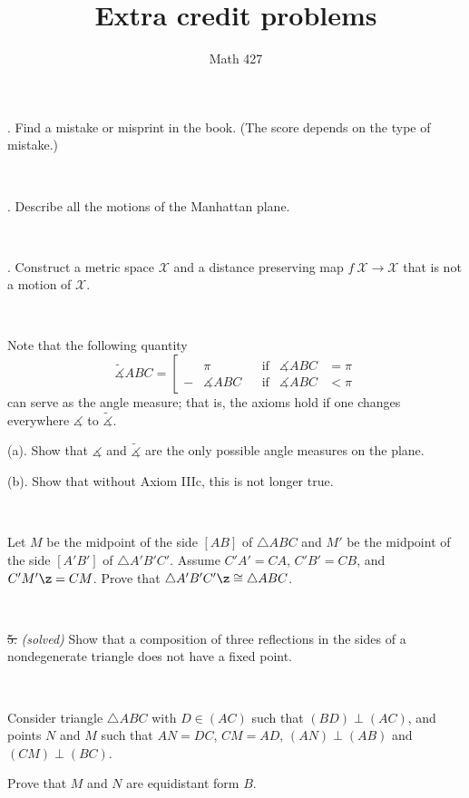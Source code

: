 \documentclass[oneside,a4paper]{article}
\begin{document}
\title{Extra credit problems}
\author{Math 427}
\date{}
\maketitle


. Find a mistake or misprint in the book.
(The score depends on the type of mistake.)

\ 

. Describe all the motions of the Manhattan plane.

\ 

. Construct a metric space $\mathcal X$ and a distance preserving map $f\:\mathcal X\to \mathcal X$ that is not a motion of $\mathcal X$.

\ 

 Note that the following quantity 
$$\tilde
\measuredangle ABC=\left[
\begin{aligned}
&\pi&&\text{if}&\measuredangle ABC&=\pi
\\
-&\measuredangle ABC&&\text{if}&\measuredangle ABC&<\pi
\end{aligned}
\right.$$
can serve as the angle measure; 
that is, the axioms hold if one changes everywhere $\measuredangle$ to $\tilde\measuredangle$.

\noi (a). Show that $\measuredangle$ and $\tilde\measuredangle$ are the only possible angle measures on the plane. 

\noi (b). Show that without Axiom IIIc, this is not longer true.

\ 

Let $M$ be the midpoint of the side $[A B]$ of $\triangle A B C$ and
$M'$ be the midpoint of the side $[A' B']$ of $\triangle A' B' C'$.
Assume $C' A'=C A$, $C' B'= C B$, and $C' M'\z= C M$.
Prove that $\triangle A' B' C'\z\cong\triangle A B C$.

\ 

\noi \sout{5.} \textit{(solved)}
Show that a composition of three reflections in the sides of a nondegenerate triangle does not have a fixed point.

\ 

 Consider triangle $\triangle A B C$ with $D\in (A C)$ such that $(BD)\perp (AC)$, and points $N$ and $M$ such that $AN=DC$, $CM=AD$, $(AN)\perp(AB)$ and $(CM)\perp(BC)$.

Prove that $M$ and $N$ are equidistant form $B$.

\ 
\end{document}
